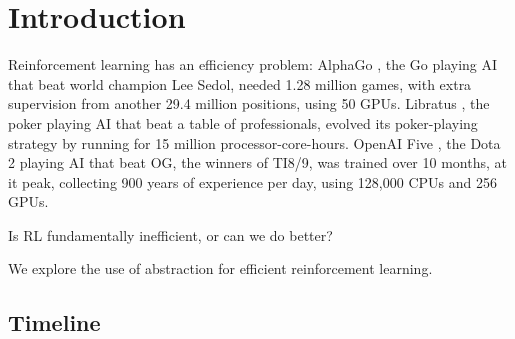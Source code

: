 \chapter{Introduction}\label{C:intro}

Reinforcement learning has an efficiency problem: AlphaGo \cite{Silver2016a}, the Go
playing AI that beat world champion Lee Sedol, needed 1.28 million games, with
extra supervision from another 29.4 million positions, using 50 GPUs.
Libratus \cite{Brown2018b}, the poker playing AI that beat a table of professionals,
evolved its poker-playing strategy by running for 15 million processor-core-hours.
OpenAI Five \cite{Berner2019}, the Dota 2 playing AI that beat OG, the winners of TI8/9, was
trained over 10 months, at it peak, collecting 900 years of experience per day, using
128,000 CPUs and 256 GPUs.

Is RL fundamentally inefficient, or can we do better?

We explore the use of abstraction for efficient reinforcement learning.





%

\section{Timeline}

